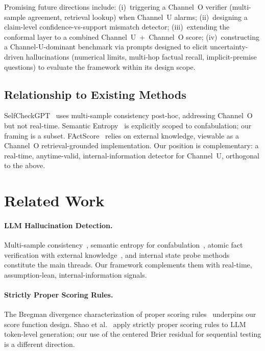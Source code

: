 \documentclass[runningheads]{llncs}
\begin{document}
Promising future directions include:
(i)~triggering a Channel~O verifier (multi-sample agreement, retrieval lookup)
when Channel~U alarms;
(ii)~designing a claim-level confidence-vs-support mismatch detector;
(iii)~extending the conformal layer to a combined Channel~U~+~Channel~O score;
(iv)~constructing a Channel-U-dominant benchmark via prompts designed to
elicit uncertainty-driven hallucinations (numerical limits, multi-hop
factual recall, implicit-premise questions) to evaluate the framework
within its design scope.

\subsection{Relationship to Existing Methods}

SelfCheckGPT~\cite{manakul2023selfcheck} uses multi-sample consistency
post-hoc, addressing Channel~O but not real-time.
Semantic Entropy~\cite{farquhar2024detecting} is explicitly scoped to
confabulation; our framing is a subset.
FActScore~\cite{min2023factscore} relies on external knowledge, viewable as
a Channel~O retrieval-grounded implementation.
Our position is complementary: a real-time, anytime-valid,
internal-information detector for Channel~U, orthogonal to the above.

\section{Related Work}

\paragraph{LLM Hallucination Detection.}
Multi-sample consistency~\cite{manakul2023selfcheck}, semantic entropy for
confabulation~\cite{farquhar2024detecting}, atomic fact verification with
external knowledge~\cite{min2023factscore}, and internal state probe
methods~\cite{azaria2023internal} constitute the main threads. Our framework
complements them with real-time, assumption-lean, internal-information signals.

\paragraph{Strictly Proper Scoring Rules.}
The Bregman divergence characterization of proper scoring
rules~\cite{gneiting2007strictly} underpins our score function design.
Shao et al.~\cite{shao2024language} apply strictly proper scoring rules
to LLM token-level generation; our use of the centered Brier residual for
sequential testing is a different direction.
\end{document}
